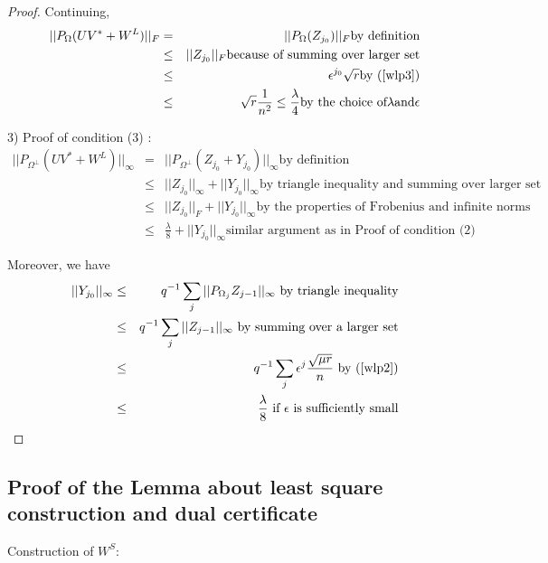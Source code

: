 \begin{proof}
Continuing,
\begin{eqnarray*}
||P_{\Omega}(UV^{*}+W^{L})||_{F} & = & ||P_{\Omega}(Z_{j_{0}})||_{F} \text{by definition}\\
 & \le & ||Z_{j_{0}}||_{F} \text{because of summing over larger set} \\
 & \le & \epsilon^{j_{0}}\sqrt{r} \text{by (\ref{wlp3})} \\
 & \le & \sqrt{r}\frac{1}{n^{2}}\le\frac{\lambda}{4} \text{by the choice of} \lambda \text{and} \epsilon
\end{eqnarray*}


3) Proof of condition (3) :
\begin{eqnarray*}
||P_{\Omega^{\bot}}(UV^{*}+W^{L})||_{\infty} & = & ||P_{\Omega^{\bot}}(Z_{j_{0}}+Y_{j_{0}})||_{\infty}\text{by definition}\\
 & \le & ||Z_{j_{0}}||_{\infty}+||Y_{j_{0}}||_{\infty} \text{by triangle inequality and summing over larger set}\\
 & \le & ||Z_{j_{0}}||_{F}+||Y_{j_{0}}||_{\infty} \text{by the properties of Frobenius and infinite norms}\\
 & \le & \frac{\lambda}{8}+||Y_{j_{0}}||_{\infty} \text{similar argument as in Proof of condition (2)}
\end{eqnarray*}


Moreover, we have
\begin{eqnarray*}
||Y_{j_{0}}||_{\infty} & \le & q^{-1}\sum_{j}||P_{\Omega_{j}}Z_{j-1}||_{\infty} \text{ by triangle inequality}\\
 & \le & q^{-1}\sum_{j}||Z_{j-1}||_{\infty} \text{ by summing over a larger set}\\
 & \le & q^{-1}\sum_{j}\epsilon^{j}\frac{\sqrt{\mu r}}{n} \text{ by (\ref{wlp2})}\\
 & \le & \frac{\lambda}{8}\text{ if \ensuremath{\epsilon}\ \text{is sufficiently small}}
\end{eqnarray*}

\end{proof}


\subsection{Proof of the Lemma about least square construction and dual certificate }

Construction of $W^{S}$:

